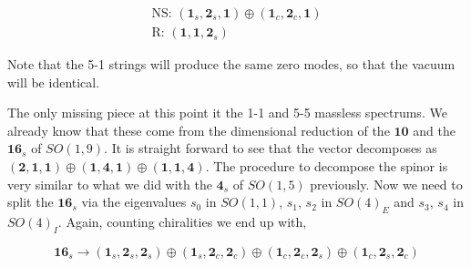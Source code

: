 \begin{align}
    \text{NS: } (\mathbf{1}_s, \mathbf{2}_s, \mathbf{1}) \oplus (\mathbf{1}_c, \mathbf{2}_c, \mathbf{1}) \\
    \text{R: } (\mathbf{1}, \mathbf{1}, \mathbf{2}_s)
\end{align}

Note that the 5-1 strings will produce the same zero modes, so that the vacuum will be identical.

The only missing piece at this point it the 1-1 and 5-5 massless spectrums. We already know that these come from the dimensional reduction of the $\mathbf{10}$ and the $\mathbf{16}_s$ of $SO(1,9)$. It is straight forward to see that the vector decomposes as $(\mathbf{2},\mathbf{1},\mathbf{1})\oplus(\mathbf{1},\mathbf{4},\mathbf{1}) \oplus(\mathbf{1},\mathbf{1},\mathbf{4})$. The procedure to decompose the spinor is very similar to what we did with the $\mathbf{4}_s$ of $SO(1,5)$ previously. Now we need to split the $\mathbf{16}_s$ via the eigenvalues $s_0$ in $SO(1,1)$, $s_1$, $s_2$ in $SO(4)_E$ and $s_3$, $s_4$ in $SO(4)_I$. Again, counting chiralities we end up with,

\begin{equation*}
    \mathbf{16}_s \rightarrow (\mathbf{1}_s, \mathbf{2}_s, \mathbf{2}_s) \oplus (\mathbf{1}_s, \mathbf{2}_c, \mathbf{2}_c) \oplus (\mathbf{1}_c, \mathbf{2}_c, \mathbf{2}_s) \oplus (\mathbf{1}_c, \mathbf{2}_s, \mathbf{2}_c)
\end{equation*}


